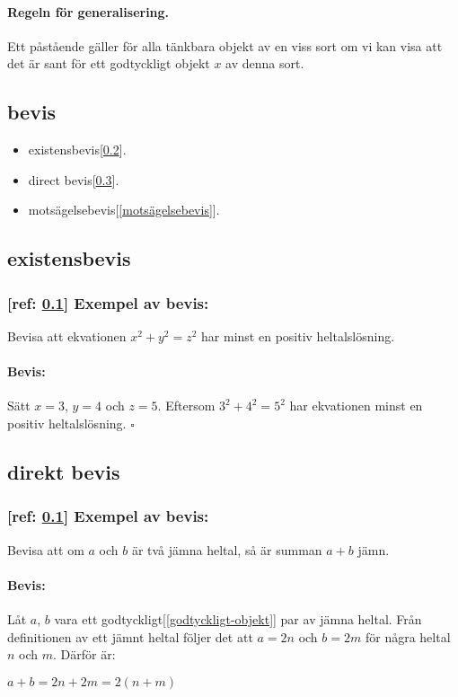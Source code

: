     \paragraph{Regeln för generalisering.} 
        Ett påstående gäller för alla tänkbara objekt av en viss sort om vi kan visa att det är sant för ett godtyckligt objekt $x$ av denna sort.
\subsection{bevis}\label{bevis}
    \begin{itemize}
        \item existensbevis[\ref{existensbevis}].
        \item direct bevis[\ref{direct-bevis}]. 
        \item motsägelsebevis[\ref{motsägelsebevis}].
    \end{itemize}
\subsection{existensbevis}\label{existensbevis}
    \subsubsection{\textbf{[ref: \ref{bevis}]} Exempel av bevis:}
        Bevisa att ekvationen $x^2 + y^2 = z^2$ har minst en positiv heltalslösning.
        \paragraph{Bevis:} 
            Sätt $x = 3$, $y = 4$ och $z = 5$. Eftersom $3^2 + 4^2 = 5^2$ har ekvationen minst en positiv heltalslösning. $\square$
\subsection{direkt bevis}\label{direct-bevis}
    \subsubsection{\textbf{[ref: \ref{bevis}]} Exempel av bevis:}
    Bevisa att om $a$ och $b$ är två jämna heltal, så är summan $a + b$ jämn.
        \paragraph{Bevis:} 
            Låt $a$, $b$ vara ett godtyckligt[\ref{godtyckligt-objekt}] par av jämna heltal. Från definitionen av ett jämnt heltal följer det att $a = 2n$ och $b = 2m$ för några heltal $n$ och $m$. Därför är: 
    \begin{center}
        $a + b = 2n + 2m = 2(n + m)$
    \end{center}
